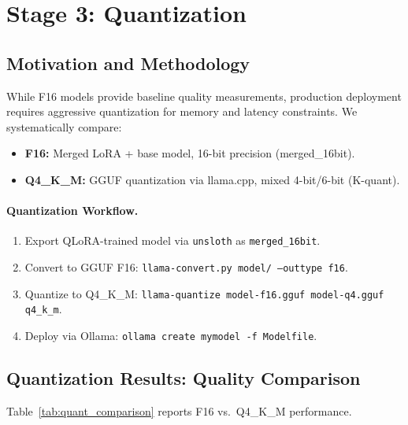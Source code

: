 \documentclass[twocolumn]{article}
\begin{document}
\section{Stage 3: Quantization}
\label{sec:quant}

\subsection{Motivation and Methodology}

While F16 models provide baseline quality measurements, production deployment requires
aggressive quantization for memory and latency constraints.
We systematically compare:
\begin{itemize}
  \item \textbf{F16:} Merged LoRA + base model, 16-bit precision (merged\_16bit).
  \item \textbf{Q4\_K\_M:} GGUF quantization via llama.cpp, mixed 4-bit/6-bit (K-quant).
\end{itemize}

\paragraph{Quantization Workflow.}
\begin{enumerate}
  \item Export QLoRA-trained model via \texttt{unsloth} as \texttt{merged\_16bit}.
  \item Convert to GGUF F16: \texttt{llama-convert.py model/ --outtype f16}.
  \item Quantize to Q4\_K\_M: \texttt{llama-quantize model-f16.gguf model-q4.gguf q4\_k\_m}.
  \item Deploy via Ollama: \texttt{ollama create mymodel -f Modelfile}.
\end{enumerate}

\subsection{Quantization Results: Quality Comparison}

Table~\ref{tab:quant_comparison} reports F16 vs.\ Q4\_K\_M performance.
\end{document}
